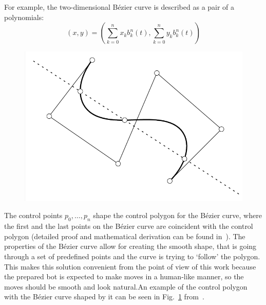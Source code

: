 For example, the two-dimensional Bézier curve is described as a pair of a polynomials:
\begin{equation}
    (x,y) = \left( \sum_{k=0}^n x_{k} b_k^n(t), \sum_{k=0}^n y_{k} b_k^n(t) \right)\label{eq:bezier-point}
\end{equation}

\begin{figure}[h!]
    \centering
    \includegraphics[width=0.4\linewidth,scale=0.4]{resources/bezier-curve-example.png}
    \label{fig:bezier-example}
\end{figure}

The control points $p_0,\dots,p_n$ shape the control polygon for the Bézier curve, where the first and the last points on the Bézier curve are coincident with the control polygon (detailed proof and mathematical derivation can be found in~\cite{farouki2012bernstein}).
The properties of the Bézier curve allow for creating the smooth shape, that is going through a set of predefined points and the curve is trying to `follow' the polygon.
This makes this solution convenient from the point of view of this work because the prepared bot is expected to make moves in a human-like manner, so the moves should be smooth and look natural.An example of the control polygon with the Bézier curve shaped by it can be seen in Fig.~\ref{fig:bezier-example} from~\cite{farouki2012bernstein}.
